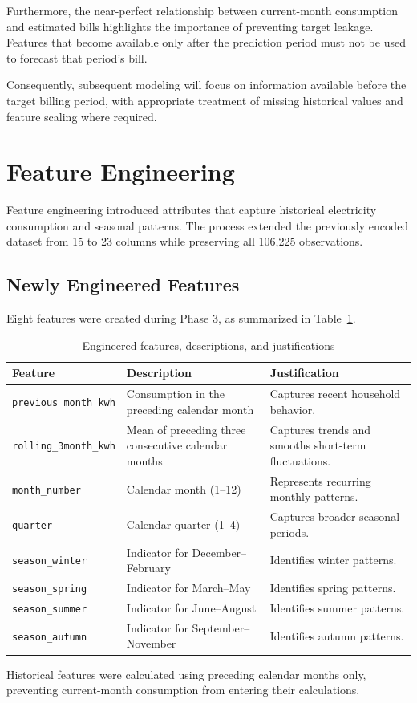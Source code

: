 \documentclass[11pt,a4paper]{article}
\begin{document}
Furthermore, the near-perfect relationship between current-month consumption and estimated bills highlights the importance of preventing target leakage. Features that become available only after the prediction period must not be used to forecast that period's bill.

Consequently, subsequent modeling will focus on information available before the target billing period, with appropriate treatment of missing historical values and feature scaling where required.

\section{Feature Engineering}
Feature engineering introduced attributes that capture historical electricity consumption and seasonal patterns. The process extended the previously encoded dataset from 15 to 23 columns while preserving all 106,225 observations.
\subsection{Newly Engineered Features}
Eight features were created during Phase 3, as summarized in Table~\ref{tab:features}.
\begin{table}[H]\centering\caption{Engineered features, descriptions, and justifications}\label{tab:features}\footnotesize
\begin{tabular}{@{}p{.28\linewidth}p{.31\linewidth}p{.33\linewidth}@{}}\toprule
Feature & Description & Justification\\\midrule
\texttt{previous\_month\_kwh} & Consumption in the preceding calendar month & Captures recent household behavior.\\
\texttt{rolling\_3month\_kwh} & Mean of preceding three consecutive calendar months & Captures trends and smooths short-term fluctuations.\\
\texttt{month\_number} & Calendar month (1--12) & Represents recurring monthly patterns.\\
\texttt{quarter} & Calendar quarter (1--4) & Captures broader seasonal periods.\\
\texttt{season\_winter} & Indicator for December--February & Identifies winter patterns.\\
\texttt{season\_spring} & Indicator for March--May & Identifies spring patterns.\\
\texttt{season\_summer} & Indicator for June--August & Identifies summer patterns.\\
\texttt{season\_autumn} & Indicator for September--November & Identifies autumn patterns.\\\bottomrule
\end{tabular}\end{table}
Historical features were calculated using preceding calendar months only, preventing current-month consumption from entering their calculations.
\end{document}
